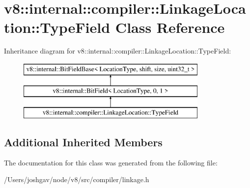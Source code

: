 \hypertarget{classv8_1_1internal_1_1compiler_1_1_linkage_location_1_1_type_field}{}\section{v8\+:\+:internal\+:\+:compiler\+:\+:Linkage\+Location\+:\+:Type\+Field Class Reference}
\label{classv8_1_1internal_1_1compiler_1_1_linkage_location_1_1_type_field}
Inheritance diagram for v8\+:\+:internal\+:\+:compiler\+:\+:Linkage\+Location\+:\+:Type\+Field\+:\begin{figure}[H]
\begin{center}
\leavevmode
\includegraphics[height=3.000000cm]{classv8_1_1internal_1_1compiler_1_1_linkage_location_1_1_type_field}
\end{center}
\end{figure}
\subsection*{Additional Inherited Members}


The documentation for this class was generated from the following file\+:\begin{DoxyCompactItemize}
\item 
/\+Users/joshgav/node/v8/src/compiler/linkage.\+h\end{DoxyCompactItemize}
